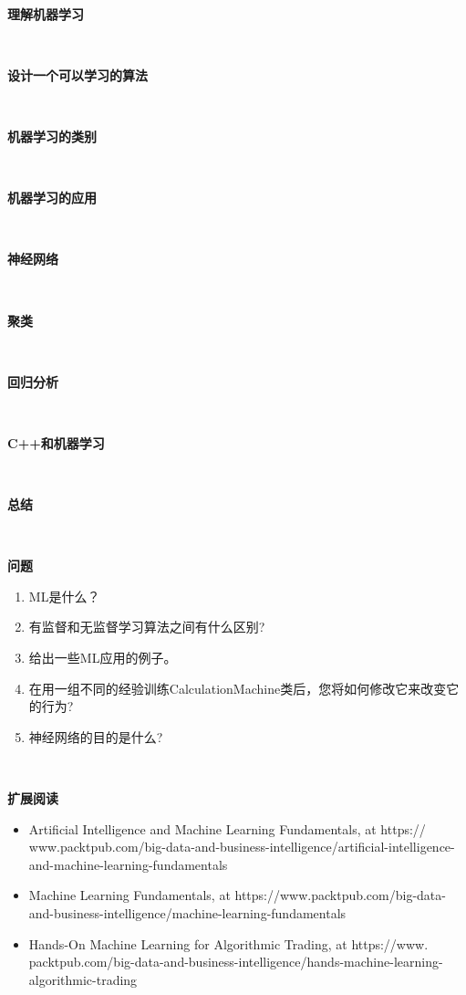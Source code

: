 \noindent\textbf{}\ \par
\textbf{理解机器学习} \ \par

\noindent\textbf{}\ \par
\textbf{设计一个可以学习的算法} \ \par

\noindent\textbf{}\ \par
\textbf{机器学习的类别} \ \par

\noindent\textbf{}\ \par
\textbf{机器学习的应用} \ \par

\noindent\textbf{}\ \par
\textbf{神经网络} \ \par

\noindent\textbf{}\ \par
\textbf{聚类} \ \par

\noindent\textbf{}\ \par
\textbf{回归分析} \ \par

\noindent\textbf{}\ \par
\textbf{C++和机器学习} \ \par

\noindent\textbf{}\ \par
\textbf{总结} \ \par

\noindent\textbf{}\ \par
\textbf{问题} \ \par
\begin{enumerate}
	\item ML是什么？
	\item 有监督和无监督学习算法之间有什么区别?
	\item 给出一些ML应用的例子。
	\item 在用一组不同的经验训练CalculationMachine类后，您将如何修改它来改变它的行为?
	\item 神经网络的目的是什么?
\end{enumerate}

\noindent\textbf{}\ \par
\textbf{扩展阅读} \ \par
\begin{itemize}
	\item Artificial Intelligence and Machine Learning Fundamentals, at  https:/​/​www.packtpub.​com/​big-​data-​and-​business-​intelligence/​artificial-intelligence-​and-​machine-​learning-​fundamentals
	\item Machine Learning Fundamentals, at  https:/​/​www.​packtpub.​com/​big-​data-​and-business-​intelligence/​machine-​learning-​fundamentals
	\item Hands-On Machine Learning for Algorithmic Trading, at  https:/​/​www.​packtpub.com/​big-​data-​and-​business-​intelligence/​hands-​machine-​learning-algorithmic-​trading
\end{itemize}

\newpage














